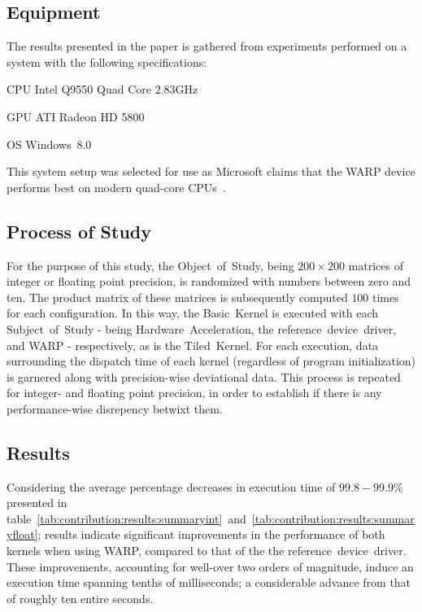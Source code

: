 \subsection{Equipment}
\label{sec:contribution:equipment}
The results presented in the paper is gathered from experiments performed on a system with the following specifications:
\begin{description*}
	\item[CPU] Intel Q9550 Quad Core $2.83$GHz
	\item[GPU] ATI Radeon HD 5800
	\item[OS\phantom{U}] Windows~8.0
\end{description*}
This system setup was selected for use as Microsoft claims that the WARP device performs best on modern quad-core CPUs~.

\subsection{Process of Study}
\label{sec:contribution:processofstudy}
For the purpose of this study, the Object~of~Study, being $200\times 200$ matrices of integer or floating point precision, is randomized with numbers between zero and ten.
The product matrix of these matrices is subsequently computed $100$ times for each configuration.
In this way, the Basic~Kernel is executed with each Subject~of~Study - being Hardware~Acceleration, the reference~device~driver, and WARP - respectively, as is the Tiled~Kernel.
For each execution, data surrounding the dispatch time of each kernel (regardless of program initialization) is garnered along with precision-wise deviational data.
This process is repeated for integer- and floating point precision, in order to establish if there is any performance-wise disrepency betwixt them.

\subsection{Results}
\label{sec:contribution:results}
Considering the average percentage decreases in execution time of $99.8-99.9\%$ presented in table~\ref{tab:contribution:results:summaryint}~and~\ref{tab:contribution:results:summaryfloat}; results indicate significant improvements in the performance of both kernels when using WARP, compared to that of the the reference~device~driver.
These improvements, accounting for well-over two orders of magnitude, induce an execution time spanning tenths of milliseconds; a considerable advance from that of roughly ten entire seconds.

